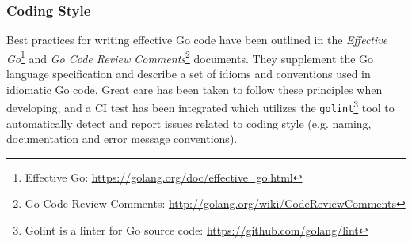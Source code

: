 
\subsubsection{Coding Style}

Best practices for writing effective Go code have been outlined in the \textit{Effective Go}\footnote{Effective Go: \url{https://golang.org/doc/effective_go.html}} and \textit{Go Code Review Comments}\footnote{Go Code Review Comments: \url{http://golang.org/wiki/CodeReviewComments}} documents. They supplement the Go language specification and describe a set of idioms and conventions used in idiomatic Go code. Great care has been taken to follow these principles when developing, and a CI test has been integrated which utilizes the \texttt{golint}\footnote{Golint is a linter for Go source code: \url{https://github.com/golang/lint}} tool to automatically detect and report issues related to coding style (e.g. naming, documentation and error message conventions).
